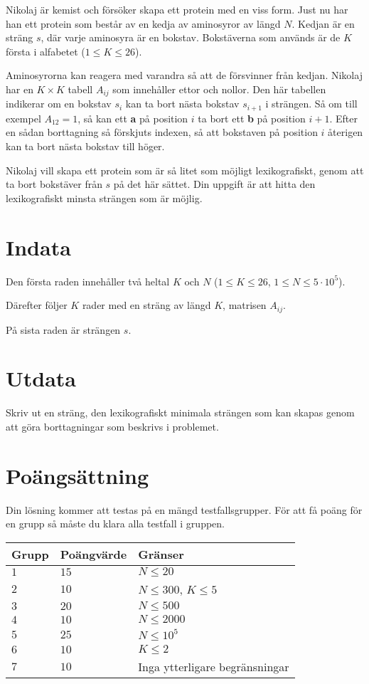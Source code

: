 
Nikolaj är kemist och försöker skapa ett protein med en viss form. Just nu har han ett protein
som består av en kedja av aminosyror av längd $N$. Kedjan är en sträng $s$, där 
varje aminosyra är en bokstav.
Bokstäverna som används är de $K$ första i alfabetet ($1 \leq K \leq 26$).

Aminosyrorna kan reagera med varandra så att de försvinner från kedjan. Nikolaj har en $K \times K$ tabell
$A_{ij}$ som innehåller ettor och nollor. Den här tabellen indikerar om en bokstav $s_i$ kan ta
bort nästa bokstav $s_{i+1}$ i strängen. Så om till exempel $A_{12} = 1$, så kan ett \textbf{a} på
position $i$ ta bort ett \textbf{b} på position $i+1$. Efter en sådan borttagning så förskjuts 
indexen, så att bokstaven på position $i$ återigen kan ta bort nästa bokstav till höger.

Nikolaj vill skapa ett protein som är så litet som möjligt lexikografiskt, genom att ta bort 
bokstäver från $s$ på det här sättet. Din uppgift är att hitta den lexikografiskt minsta
strängen som är möjlig.

\section*{Indata}

Den första raden innehåller två heltal $K$ och $N$ ($1 \leq K \leq 26$, $1 \leq N \leq 5 \cdot 10^5$).

Därefter följer $K$ rader med en sträng av längd $K$, matrisen $A_{ij}$.

På sista raden är strängen $s$.

\section*{Utdata}
Skriv ut en sträng, den lexikografiskt minimala strängen som kan skapas genom att göra borttagningar
som beskrivs i problemet.

\section*{Poängsättning}
Din lösning kommer att testas på en mängd testfallsgrupper.
För att få poäng för en grupp så måste du klara alla testfall i gruppen.

\noindent
\begin{tabular}{| l | l | p{12cm} |}
  \hline
  Grupp & Poängvärde & Gränser \\ \hline
 
  $1$   & $15$       & $N \leq 20$\\ \hline
  $2$   & $10$       & $N \leq 300$, $K \leq 5$  \\ \hline
  $3$   & $20$       & $N \leq 500$ \\ \hline
  $4$   & $10$       & $N \leq 2000$ \\ \hline
  $5$   & $25$       & $N \leq 10^5$ \\ \hline
  $6$   & $10$       & $K \leq 2$ \\ \hline
  $7$   & $10$       & Inga ytterligare begränsningar \\ \hline
\end{tabular}
